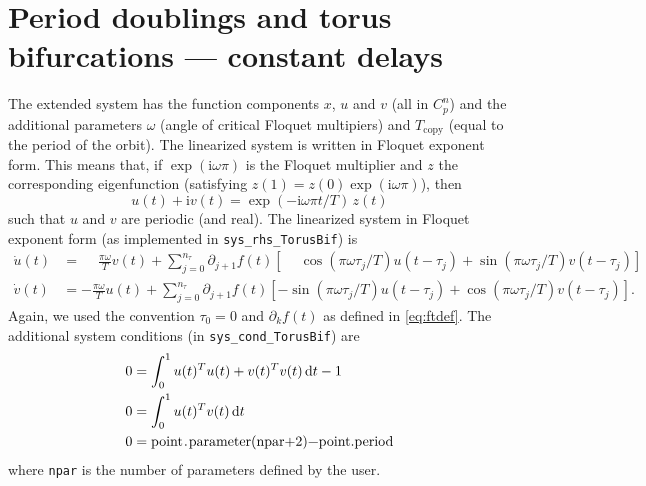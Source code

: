 \documentclass[11pt]{scrartcl}
\newcommand{\mt}[1]{\mathrm{#1}}
\renewcommand{\i}{\mt{i}}
\renewcommand{\d}{\mathop{}\!\mathrm{d}}
\newcommand{\blist}[1]{\mbox{\lstinline!#1!}}
\begin{document}
\section{Period doublings and torus bifurcations --- constant
  delays}
\label{sec:ext:tr}
The extended system has the function components $x$, $u$ and $v$ (all
in $C_p^n$) and the additional parameters $\omega$ (angle of critical
Floquet multipiers) and $T_\mathrm{copy}$ (equal to the period of the
orbit). The linearized system is written in Floquet exponent
form. This means that, if $\exp(\i \omega\pi)$ is the Floquet multiplier
and $z$ the corresponding eigenfunction (satisfying
$z(1)=z(0)\exp(\i\omega\pi)$), then
\begin{displaymath}
  u(t)+\i v(t)=\exp(-\i\omega\pi t/T)\,z(t)
\end{displaymath}
such that $u$ and $v$ are periodic (and real). The linearized system
in Floquet exponent form (as implemented in \blist{sys_rhs_TorusBif}) is
\begin{align}
  \label{eq:tr:u}
  \dot u(t) &=\phantom{-}\frac{\pi\omega}{T}v(t)+
  \sum_{j=0}^{n_\tau}\partial_{j+1}f(t)\left[\phantom{-}\cos(\pi\omega\tau_j/T)u(t-\tau_j)+
  \sin(\pi\omega\tau_j/T)v(t-\tau_j)\right]\\
  \label{eq:tr:v}
  \dot v(t) &=-\frac{\pi\omega}{T}u(t)+
  \sum_{j=0}^{n_\tau}\partial_{j+1}f(t)\left[-\sin(\pi\omega\tau_j/T)u(t-\tau_j)+
  \cos(\pi\omega\tau_j/T)v(t-\tau_j)\right]\mbox{.}
\end{align}
Again, we used the convention $\tau_0=0$ and $\partial_kf(t)$ as
defined in \eqref{eq:ftdef}.  The additional system conditions (in
\blist{sys_cond_TorusBif}) are
\begin{align}
  0&=\int_0^1 u(t)^Tu(t)+v(t)^Tv(t)\d t-1\label{eq:vtvutu:norm}\\
  0&=\int_0^1 u(t)^Tv(t)\d t\label{eq:vtu:orth}\\
  0&=\blist{point.parameter(npar+2)-point.period} \label{eq:tr:tcopy}
\end{align}
where \blist{npar} is the number of parameters defined by the user.
\end{document}
